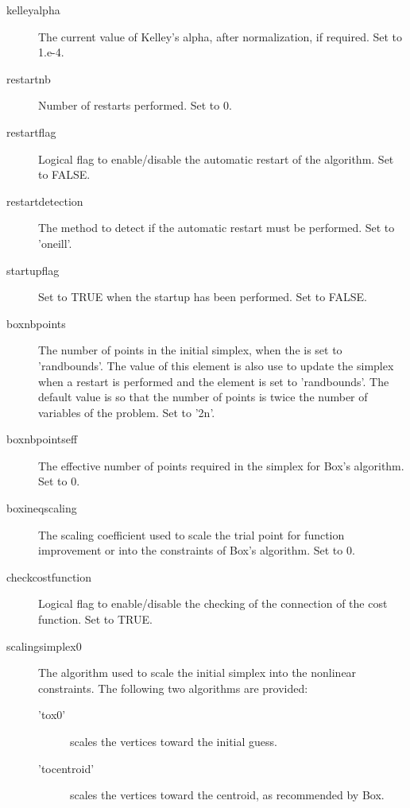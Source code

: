 \begin{Value}
\begin{description}
\item[kelleyalpha] The current value of Kelley's alpha, after normalization,
if required. Set to 1.e-4.
\item[restartnb] Number of restarts performed. Set to 0.
\item[restartflag] Logical flag to enable/disable the automatic restart of
the algorithm. Set to FALSE.
\item[restartdetection] The method to detect if the automatic restart must
be performed. Set to 'oneill'.
\item[startupflag] Set to TRUE when the startup has been performed. Set to
FALSE.
\item[boxnbpoints] The number of points in the initial simplex, when the
 is set to 'randbounds'. The value of this element is
also use to update the simplex when a restart is performed and the
 element is set to 'randbounds'. The default
value is so that the number of points is twice the number of variables of
the problem. Set to '2n'.
\item[boxnbpointseff] The effective number of points required in the simplex
for Box's algorithm. Set to 0.
\item[boxineqscaling] The scaling coefficient used to scale the trial point
for function improvement or into the constraints of Box's algorithm. Set
to 0.
\item[checkcostfunction] Logical flag to enable/disable the checking of the
connection of the cost function. Set to TRUE.
\item[scalingsimplex0] The algorithm used to scale the initial simplex into
the nonlinear constraints. The following two algorithms are provided:
\begin{description}

\item['tox0'] scales the vertices toward the initial guess.
\item['tocentroid'] scales the vertices toward the centroid, as
recommended by Box.

\end{description}


\end{description}
\end{Value}
